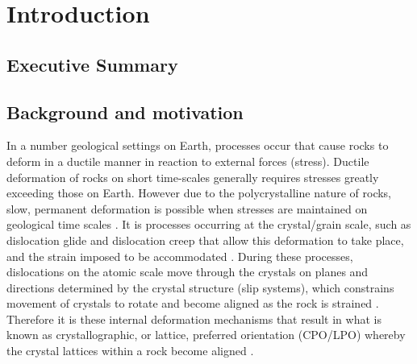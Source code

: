 \documentclass[a4paper,12pt,twoside]{report}
\numberwithin{equation}{chapter}
\begin{document}

\chapter{Introduction} \label{chap:intro}
\vspace{-1cm}

\section{Executive Summary} \label{sec:summary}

\section{Background and motivation} \label{sec:background}
In a number geological settings on Earth, processes occur that cause rocks to deform in a ductile manner in reaction to external forces (stress). Ductile deformation of rocks on short time-scales generally requires stresses greatly exceeding those on Earth. However due to the polycrystalline nature of rocks, slow, permanent deformation is possible when stresses are maintained on geological time scales \citep{Weiss1985}. It is processes occurring at the crystal/grain scale, such as dislocation glide and dislocation creep that allow this deformation to take place, and the strain imposed to be accommodated \citep{Ashby1972}. During these processes, dislocations on the atomic scale move through the crystals on planes and directions determined by the crystal structure (slip systems), which constrains movement of crystals to rotate and become aligned as the rock is strained \citep{Goulding2015}. Therefore it is these internal deformation mechanisms that result in what is known as crystallographic, or lattice, preferred orientation (CPO/LPO) whereby the crystal lattices within a rock become aligned \citep{Price1985}.   
\end{document}
